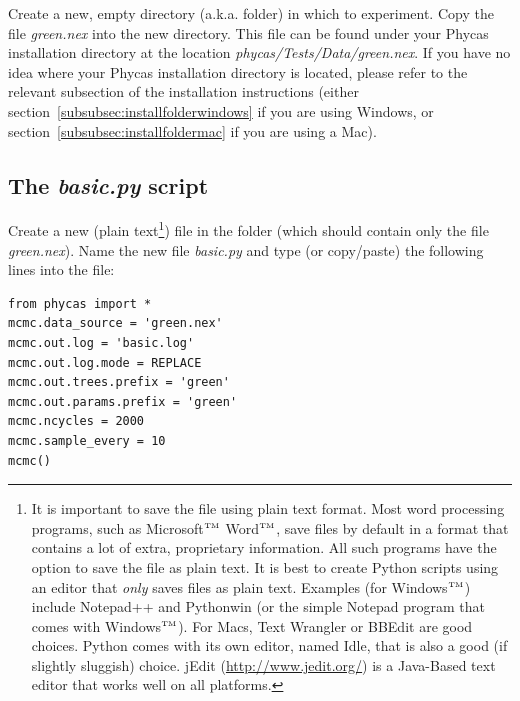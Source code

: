 \documentclass[10pt]{article}
\newcommand{\trademark}[1]{#1${}^{\mbox{\tiny TM}}$}
\newcommand{\pathname}[1]{{\em #1}}				%
\begin{document}
Create a new, empty directory (a.k.a. folder) in which to experiment. Copy the file \pathname{green.nex} into the new directory. This file can be found under your Phycas installation directory at the location \pathname{phycas/Tests/Data/green.nex}. If you have no idea where your Phycas installation directory is located, please refer to the relevant subsection of the installation instructions (either section~\ref{subsubsec:installfolderwindows} if you are using Windows, or section~\ref{subsubsec:installfoldermac} if you are using a Mac).

\subsection{The {\em basic.py} script}
Create a new (plain text\footnote{It is important to save the file using plain text format. Most word processing programs, such as \trademark{Microsoft} \trademark{Word}, save files by default in a format that contains a lot of extra, proprietary information. All such programs have the option to save the file as plain text. It is best to create Python scripts using an editor that {\em only} saves files as plain text. Examples (for \trademark{Windows}) include Notepad++ and Pythonwin (or the simple Notepad program that comes with \trademark{Windows}). For Macs, Text Wrangler or BBEdit are good choices. Python comes with its own editor, named Idle, that is also a good (if slightly sluggish) choice. jEdit (\url{http://www.jedit.org/}) is a Java-Based text editor that works well on all platforms.}) file in the folder (which should contain only the file \pathname{green.nex}). Name the new file \pathname{basic.py} and type (or copy/paste) the following lines into the file:
\begin{verbatim}
from phycas import *
mcmc.data_source = 'green.nex'
mcmc.out.log = 'basic.log'
mcmc.out.log.mode = REPLACE
mcmc.out.trees.prefix = 'green'
mcmc.out.params.prefix = 'green'
mcmc.ncycles = 2000
mcmc.sample_every = 10
mcmc()
\end{verbatim}

\end{document}
